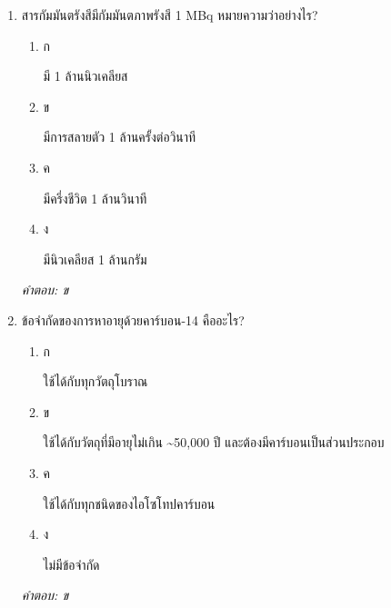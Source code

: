 \documentclass[12pt]{article}
\begin{document}
\begin{enumerate}[label=\arabic*., itemsep=0.5\baselineskip, topsep=0.5\baselineskip, leftmargin=*]
\item สารกัมมันตรังสีมีกัมมันตภาพรังสี 1 MBq หมายความว่าอย่างไร?
\begin{enumerate}[label=\alph*)., itemsep=0.3\baselineskip, topsep=0.3\baselineskip]
\item ก\ 
\begin{minipage}[t]{0.9\linewidth}
\raggedright มี 1 ล้านนิวเคลียส
\end{minipage}
\item ข\ 
\begin{minipage}[t]{0.9\linewidth}
\raggedright มีการสลายตัว 1 ล้านครั้งต่อวินาที
\end{minipage}
\item ค\ 
\begin{minipage}[t]{0.9\linewidth}
\raggedright มีครึ่งชีวิต 1 ล้านวินาที
\end{minipage}
\item ง\ 
\begin{minipage}[t]{0.9\linewidth}
\raggedright มีนิวเคลียส 1 ล้านกรัม
\end{minipage}
\end{enumerate}
\vspace{-0.3\baselineskip}
\begin{small}
\textit{คำตอบ: ข}
\end{small}

\item ข้อจำกัดของการหาอายุด้วยคาร์บอน-14 คืออะไร?
\begin{enumerate}[label=\alph*)., itemsep=0.3\baselineskip, topsep=0.3\baselineskip]
\item ก\ 
\begin{minipage}[t]{0.9\linewidth}
\raggedright ใช้ได้กับทุกวัตถุโบราณ
\end{minipage}
\item ข\ 
\begin{minipage}[t]{0.9\linewidth}
\raggedright ใช้ได้กับวัตถุที่มีอายุไม่เกิน \textasciitilde{}50,000 ปี และต้องมีคาร์บอนเป็นส่วนประกอบ
\end{minipage}
\item ค\ 
\begin{minipage}[t]{0.9\linewidth}
\raggedright ใช้ได้กับทุกชนิดของไอโซโทปคาร์บอน
\end{minipage}
\item ง\ 
\begin{minipage}[t]{0.9\linewidth}
\raggedright ไม่มีข้อจำกัด
\end{minipage}
\end{enumerate}
\vspace{-0.3\baselineskip}
\begin{small}
\textit{คำตอบ: ข}
\end{small}


\end{enumerate}
\end{document}
